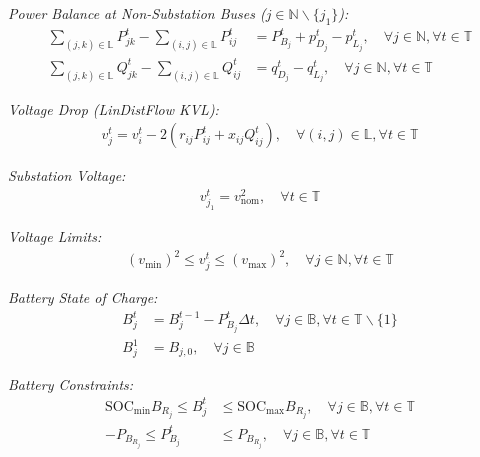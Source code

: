 \textit{Power Balance at Non-Substation Buses ($j \in \mathbb{N} \backslash \{j_1\}$):}
\begin{align}
    \sum_{(j, k) \in \mathbb{L}} P_{jk}^t - \sum_{(i, j) \in \mathbb{L}} P_{ij}^t &= P_{B_j}^t + p_{D_j}^t - p_{L_j}^t, \quad \forall j \in \mathbb{N} , \forall t \in \mathbb{T} \label{eq:nodal-real-power-balance-ldf} \\
    \sum_{(j, k) \in \mathbb{L}} Q_{jk}^t - \sum_{(i, j) \in \mathbb{L}} Q_{ij}^t &= q_{D_j}^t - q_{L_j}^t, \quad \forall j \in \mathbb{N} , \forall t \in \mathbb{T} \label{eq:nodal-reactive-power-balance-ldf}
\end{align}

\textit{Voltage Drop (LinDistFlow KVL):}
\begin{align}
    v_j^t = v_i^t - 2(r_{ij}P_{ij}^t + x_{ij}Q_{ij}^t), \quad \forall (i,j) \in \mathbb{L}, \forall t \in \mathbb{T} \label{eq:kvl-ldf}
\end{align}

\textit{Substation Voltage:}
\begin{align}
    v_{j_1}^t = v_{\text{nom}}^2, \quad \forall t \in \mathbb{T} \label{eq:subs-voltage-ldf}
\end{align}

\textit{Voltage Limits:}
\begin{align}
    (v_{\min})^2 \leq v_j^t \leq (v_{\max})^2, \quad \forall j \in \mathbb{N}, \forall t \in \mathbb{T} \label{eq:voltage-limits-ldf}
\end{align}

\textit{Battery State of Charge:}
\begin{align}
    B_j^t &= B_j^{t-1} - P_{B_j}^t \Delta t, \quad \forall j \in \mathbb{B}, \forall t \in \mathbb{T} \backslash \{1\} \label{eq:battery-soc-trajectory-ldf} \\
    B_j^1 &= B_{j,0}, \quad \forall j \in \mathbb{B} \label{eq:battery-initial-soc-ldf}
\end{align}

\textit{Battery Constraints:}
\begin{align}
    \text{SOC}_{\min} B_{R_j} \leq B_j^t &\leq \text{SOC}_{\max} B_{R_j}, \quad \forall j \in \mathbb{B}, \forall t \in \mathbb{T} \label{eq:battery_soc_limits} \\
    -P_{B_{R_j}} \leq P_{B_j}^t &\leq P_{B_{R_j}}, \quad \forall j \in \mathbb{B}, \forall t \in \mathbb{T} \label{eq:batter-real-power-limits-ldf}
\end{align}

